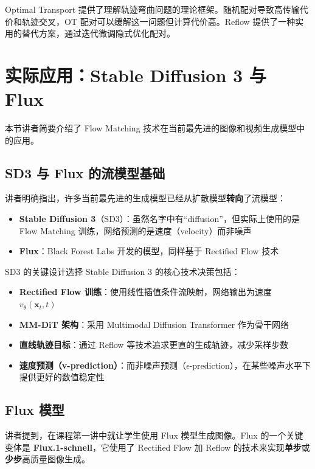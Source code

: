 \documentclass[a4paper]{article}
\begin{document}
Optimal Transport 提供了理解轨迹弯曲问题的理论框架。随机配对导致高传输代价和轨迹交叉，OT 配对可以缓解这一问题但计算代价高。Reflow 提供了一种实用的替代方案，通过迭代微调隐式优化配对。

\section{实际应用：Stable Diffusion 3 与 Flux}

本节讲者简要介绍了 Flow Matching 技术在当前最先进的图像和视频生成模型中的应用。

\subsection{SD3 与 Flux 的流模型基础}

讲者明确指出，许多当前最先进的生成模型已经从扩散模型\textbf{转向}了流模型：

\begin{itemize}
    \item \textbf{Stable Diffusion 3}（SD3）：虽然名字中有``diffusion''，但实际上使用的是 Flow Matching 训练，网络预测的是速度（velocity）而非噪声
    \item \textbf{Flux}：Black Forest Labs 开发的模型，同样基于 Rectified Flow 技术
\end{itemize}

\begin{importantbox}{SD3 的关键设计选择}
Stable Diffusion 3 的核心技术决策包括：
\begin{itemize}
    \item \textbf{Rectified Flow 训练}：使用线性插值条件流映射，网络输出为速度 $v_\theta(\mathbf{x}_t, t)$
    \item \textbf{MM-DiT 架构}：采用 Multimodal Diffusion Transformer 作为骨干网络
    \item \textbf{直线轨迹目标}：通过 Reflow 等技术追求更直的生成轨迹，减少采样步数
    \item \textbf{速度预测（v-prediction）}：而非噪声预测（$\epsilon$-prediction），在某些噪声水平下提供更好的数值稳定性
\end{itemize}
\end{importantbox}

\subsection{Flux 模型}

讲者提到，在课程第一讲中就让学生使用 Flux 模型生成图像。Flux 的一个关键变体是 \textbf{Flux.1-schnell}，它使用了 Rectified Flow 加 Reflow 的技术来实现\textbf{单步}或\textbf{少步}高质量图像生成。
\end{document}

